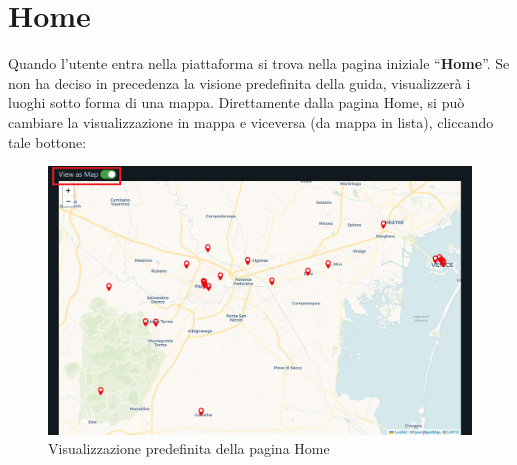 \section{Home} {
    Quando l'utente entra nella piattaforma si trova nella pagina iniziale ``\textbf{Home}''. \aCapo
    Se non ha deciso in precedenza la visione predefinita della guida, visualizzerà i luoghi sotto forma di una mappa. 
    Direttamente dalla pagina Home, si può cambiare la visualizzazione in mappa e viceversa (da mappa in lista), cliccando tale bottone:
    \begin{figure}[H]
        \includegraphics[width=12cm]{sezioni/images/home.png}
        \centering
        \caption{Visualizzazione predefinita della pagina Home}
    \end{figure}

}
